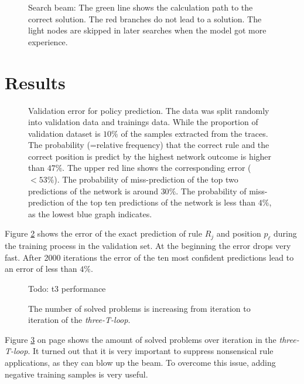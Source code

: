 \documentclass{scrartcl}
\theoremstyle{definition}
\begin{document}
\begin{figure}[!htbp]
	\centering
	
	\caption{Search beam: The green line shows the calculation path to the correct solution.
	The red branches do not lead to a solution.
	The light nodes are skipped in later searches when the model got more experience.}
	\label{fig:beam_search}
\end{figure}


\section{Results}

\begin{figure}[!htbp]
	\centering
	
	\caption{Validation error for policy prediction. The data was split randomly into validation data and trainings data.
	While the proportion of validation dataset is $10\%$ of the samples extracted from the traces.
	The probability (=relative frequency) that the correct rule and the correct position is predict by the highest network outcome is higher than $ 47\%$.
	The upper red line shows the corresponding error ($<53\%$).
	The probability of miss-prediction of the top two predictions of the network is around $30\%$.
	The probability of miss-prediction of the top ten predictions of the network is less than $4\%$, as the lowest blue graph indicates.
	}
	\label{fig:training}
\end{figure}

Figure \ref{fig:training} shows the error of the exact prediction of rule $R_j$ and position $p_\ell$ during the training process in the validation set.
At the beginning the error drops very fast. After 2000 iterations the error of the ten most confident predictions lead to an error of less than $4\%$.


\begin{figure}[!htbp]
	\centering
	Todo: t3 performance
	\caption{The number of solved problems is increasing from iteration to iteration of the \textit{three-T-loop}.}
	\label{fig:t3loop_performance}
\end{figure}

Figure \ref{fig:t3loop_performance} on page \pageref{fig:t3loop_performance} shows the amount of solved problems over iteration in the \textit{three-T-loop}. 
It turned out that it is very important to suppress nonsensical rule applications, as they can blow up the beam.
To overcome this issue, adding negative training samples is very useful.
\end{document}
